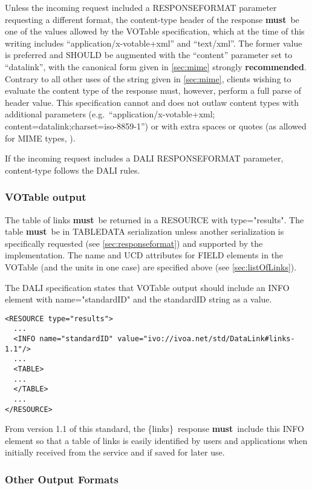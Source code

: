 \documentclass[11pt,a4paper]{ivoa}
\newcommand{\blinks}{\{links\}}
\newcommand{\attval}[2]{#1={\allowbreak}{"}#2{"}}
\newcommand{\rfcmust}{\textbf{must}}
\newcommand{\rfcrecommended}{\textbf{recommended}}
\begin{document}
Unless the incoming request included a RESPONSEFORMAT parameter requesting
a different format, the content-type header of the response \rfcmust\ be one of the
values allowed by the VOTable specification, which at the time of this writing includes
``application/x-votable+xml'' and ``text/xml''. The former value is preferred
and SHOULD be augmented with the ``content'' parameter set to ``datalink'',
with the canonical form given in \ref{sec:mime}
strongly \rfcrecommended. Contrary to
all other uses of the string given in \ref{sec:mime},
clients wishing to evaluate
the content type of the response must, however, perform a full parse
of header value. This specification cannot and does not outlaw content
types with additional parameters
(e.g.\ ``application/x-votable+xml; content=datalink;charset=iso-8859-1'')
or with extra spaces or quotes
(as allowed for MIME types, \citet{std:RFC2045}).

If the incoming request includes a DALI RESPONSEFORMAT parameter,
content-type follows the DALI rules.


\subsubsection{VOTable output}
\label{sec:output}

The table of links \rfcmust\ be returned in a RESOURCE with
\attval{type}{results}. The table \rfcmust\ be in TABLEDATA serialization
unless another serialization is specifically requested
(see \ref{sec:responseformat})
and supported by the implementation.
The name and UCD attributes for FIELD elements in the VOTable
(and the units in one case) are specified above (see \ref{sec:listOfLinks}).

The DALI specification states that VOTable output should include an
INFO element with \attval{name}{standardID} and the standardID string as a value.
\begin{verbatim}
<RESOURCE type="results">
  ...
  <INFO name="standardID" value="ivo://ivoa.net/std/DataLink#links-1.1"/>
  ...
  <TABLE>
  ...
  </TABLE>
  ...
</RESOURCE>
\end{verbatim}
From version 1.1 of this standard, the \blinks\ response \rfcmust\ include this
INFO element so that a table of links is easily identified by users and applications
when initially received from the service and if saved for later use.

\subsubsection{Other Output Formats}
\end{document}
